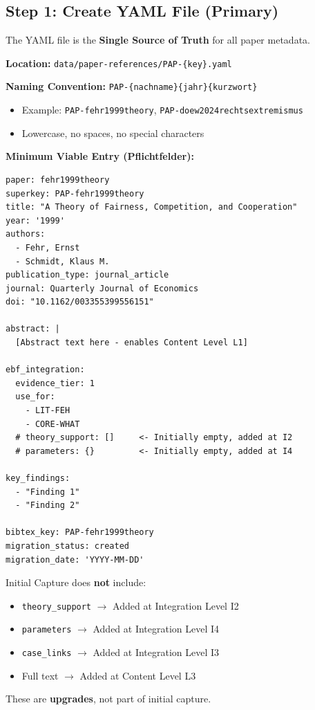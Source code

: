 \subsection{Step 1: Create YAML File (Primary)}
\label{sec:ersterfassung-yaml}

The YAML file is the \textbf{Single Source of Truth} for all paper metadata.

\textbf{Location:} \texttt{data/paper-references/PAP-\{key\}.yaml}

\textbf{Naming Convention:} \texttt{PAP-\{nachname\}\{jahr\}\{kurzwort\}}
\begin{itemize}[nosep]
    \item Example: \texttt{PAP-fehr1999theory}, \texttt{PAP-doew2024rechtsextremismus}
    \item Lowercase, no spaces, no special characters
\end{itemize}

\textbf{Minimum Viable Entry (Pflichtfelder):}

\begin{verbatim}
paper: fehr1999theory
superkey: PAP-fehr1999theory
title: "A Theory of Fairness, Competition, and Cooperation"
year: '1999'
authors:
  - Fehr, Ernst
  - Schmidt, Klaus M.
publication_type: journal_article
journal: Quarterly Journal of Economics
doi: "10.1162/003355399556151"

abstract: |
  [Abstract text here - enables Content Level L1]

ebf_integration:
  evidence_tier: 1
  use_for:
    - LIT-FEH
    - CORE-WHAT
  # theory_support: []     <- Initially empty, added at I2
  # parameters: {}         <- Initially empty, added at I4

key_findings:
  - "Finding 1"
  - "Finding 2"

bibtex_key: PAP-fehr1999theory
migration_status: created
migration_date: 'YYYY-MM-DD'
\end{verbatim}

\begin{tcolorbox}[colback=yellow!5!white, colframe=yellow!75!black,
    title=Note: What Ersterfassung Does NOT Include]
Initial Capture does \textbf{not} include:
\begin{itemize}[nosep]
    \item \texttt{theory\_support} $\rightarrow$ Added at Integration Level I2
    \item \texttt{parameters} $\rightarrow$ Added at Integration Level I4
    \item \texttt{case\_links} $\rightarrow$ Added at Integration Level I3
    \item Full text $\rightarrow$ Added at Content Level L3
\end{itemize}
These are \textbf{upgrades}, not part of initial capture.
\end{tcolorbox}

